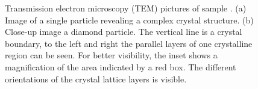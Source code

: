 \begin{figure}[htp]
\begin{subfigure}[t]{ 0.49\linewidth}


					\end{subfigure}
					\caption[\TEM imaging of a single \nd]{Transmission electron microscopy (TEM) pictures of sample \insituH. (a) Image of a single \nd particle revealing a complex crystal structure. (b) Close-up image a diamond particle. The vertical line is a crystal boundary, to the left and right the parallel layers of one crystalline region can be seen. For better visibility, the inset shows a magnification of the area indicated by a red box. The different orientations of the crystal lattice layers is visible.}
					\label{fig::tem}
				\end{figure}
